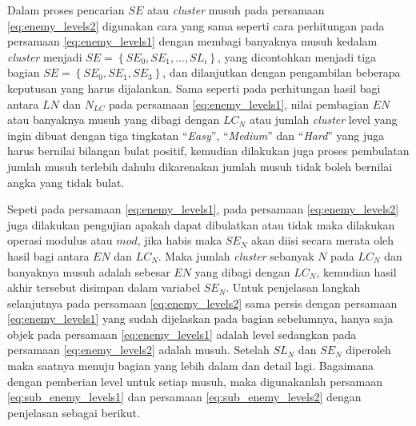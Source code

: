 Dalam proses pencarian $SE$ atau \textit{cluster} musuh pada persamaan \ref{eq:enemy_levels2} digunakan cara yang sama seperti cara perhitungan pada persamaan \ref{eq:enemy_levels1} dengan membagi banyaknya musuh kedalam \textit{cluster} menjadi $SE = \left \{SE_{0}, SE_{1},... , SL_{i} \right\}$, yang dicontohkan menjadi tiga bagian $SE = \left \{SE_{0}, SE_{1}, SE_{3} \right \}$, dan dilanjutkan dengan pengambilan beberapa keputusan yang harus dijalankan. Sama seperti pada perhitungan hasil bagi antara $LN$ dan $N_{LC}$ pada persamaan \ref{eq:enemy_levels1}, nilai pembagian $EN$ atau banyaknya musuh yang dibagi dengan $LC_{N}$ atau jumlah \textit{cluster} level yang ingin dibuat dengan tiga tingkatan ``\textit{Easy}'', ``\textit{Medium}'' dan ``\textit{Hard}'' yang juga harus bernilai bilangan bulat positif, kemudian dilakukan juga proses pembulatan jumlah musuh terlebih dahulu dikarenakan jumlah musuh tidak boleh bernilai angka yang tidak bulat. 
\vspace{1ex}

Sepeti pada persamaan \ref{eq:enemy_levels1}, pada persamaan \ref{eq:enemy_levels2} juga dilakukan pengujian apakah dapat dibulatkan atau tidak maka dilakukan operasi modulus atau $mod$, jika habis maka $SE_{N}$ akan diisi secara merata oleh hasil bagi antara $EN$ dan $LC_{N}$. Maka jumlah \textit{cluster} sebanyak $N$ pada $LC_{N}$ dan banyaknya musuh adalah sebesar $EN$ yang dibagi dengan $LC_{N}$, kemudian hasil akhir tersebut disimpan dalam variabel $SE_{N}$. Untuk penjelasan langkah selanjutnya pada persamaan \ref{eq:enemy_levels2} sama persis dengan persamaan \ref{eq:enemy_levels1} yang sudah dijelaskan pada bagian sebelumnya, hanya saja objek pada persamaan \ref{eq:enemy_levels1} adalah level sedangkan pada persamaan \ref{eq:enemy_levels2} adalah musuh. Setelah $SL_{N}$ dan $SE_{N}$ diperoleh maka saatnya menuju bagian yang lebih dalam dan detail lagi. Bagaimana dengan pemberian level untuk setiap musuh, maka digunakanlah persamaan \ref{eq:sub_enemy_levels1} dan persamaan \ref{eq:sub_enemy_levels2} dengan penjelasan sebagai berikut.
\vspace{1ex}

